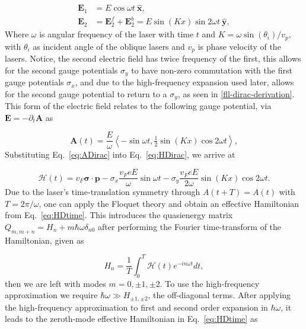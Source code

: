 \documentclass[aps,prb,twocolumn,showpacs,superscriptaddress]{revtex4-2}
\let\oldhat\hat
\renewcommand{\hat}[1]{\oldhat{\mathbf{#1}}}
\renewcommand{\vec}[1]{\mathbf{#1}}
\newcommand{\ham}{\mathcal{H}}
\begin{document}
\begin{align} \label{eq:EDfield}
\vec{E}_{1} &= E\cos \omega t\ \hat{x}, \nonumber \\
\vec{E}_{2} &= \vec{E}_2^f + \vec{E}_2^b = E\sin(Kx)\sin 2\omega t\ \hat{y},
\end{align}
Where $\omega$ is angular frequency of the laser with time $t$ and $K = \omega \sin{(\theta_i)} / v_p$, with $\theta_i$ as incident angle of the oblique lasers and $v_p$ is phase velocity of the lasers.
Notice, the second electric field has twice frequency of the first, this allows for the second gauge potentials $\sigma_y$ to have non-zero commutation with the first gauge potentials $\sigma_x$, and due to the high-frequency expansion used later, allows for the second gauge potential to return to a $\sigma_y$, as seen in \ref{fll-dirac-derivation}.
This form of the electric field relates to the following gauge potential, via $\vec{E} = -\partial_t \vec{A}$ as

\begin{equation}\label{eq:ADirac}
  \vec{A}(t)= \dfrac{E}{\omega} \left\langle -\sin \omega t, \tfrac{1}{2}\sin(Kx) \cos 2\omega t \right\rangle,
\end{equation}%
Substituting Eq.~\eqref{eq:ADirac} into Eq.~\eqref{eq:HDirac}, we arrive at%

\begin{equation}\label{eq:HDtime}
  \ham(t)= v_{F}\bm{\sigma}\cdot\vec{p} - \sigma _{x} \dfrac{v_F eE}{\omega} \sin {\omega t} - \sigma _{y} \dfrac{v_F eE}{2\omega}\sin{(Kx)} \cos2\omega t.
\end{equation}%
Due to the laser's time-translation symmetry through $A(t+T)=A(t)$ with $T=2\pi /\omega $, one can apply the Floquet theory \cite{AEE, MBL, supp} and obtain an effective Hamiltonian from Eq.~\eqref{eq:HDtime}.
This introduces the quasienergy matrix $Q_{m,m+n} = H_n + m\hbar\omega\delta_{n0}$ after performing the Fourier time-transform of the Hamiltonian, given as

\begin{equation} \label{eq:fourier-time-transform}
  H_n = \dfrac{1}{T} \int_{0}^{T} \ham(t) e^{-in\omega t} dt,
\end{equation}
then we are left with modes $m=0,\pm1,\pm2$.
To use the high-frequency approximation we require $\hbar\omega \gg H_{\pm1,\pm2}$, the off-diagonal terms.
After applying the high-frequency approximation to first and second order expansion in $\hbar\omega$, it leads to the zeroth-mode effective Hamiltonian in Eq.~\eqref{eq:HDtime} as
\end{document}
